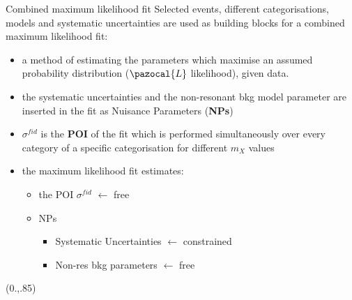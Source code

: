\documentclass[10pt,UKenglish, leqno, xcolor = dvipsnames]{beamer}
\begin{document}
	\begin{frame}{Combined maximum likelihood fit}
		\vfill
		Selected events, different categorisations, models and systematic uncertainties are used as building blocks for a combined maximum likelihood fit:
		\begin{itemize}
			\item a method of estimating the parameters which maximise an assumed probability distribution ($\pazocal{L}$ likelihood), given data.
			\item the systematic uncertainties and the non-resonant bkg model parameter are inserted in the fit as Nuisance Parameters (\textbf{NPs})
			\item $\sigma^{fid}$ is the \textbf{POI} of the fit which is performed simultaneously over every category of a specific categorisation for different $m_X$ values
			\item the maximum likelihood fit estimates:
			\begin{itemize}
				\item the POI $\sigma^{fid}$  $\leftarrow$ free
				\item NPs
				\begin{itemize}
					\item Systematic Uncertainties $\leftarrow$ constrained 
					\item Non-res bkg parameters $\leftarrow$ free
				\end{itemize}
			\end{itemize}
		\end{itemize}
		\vspace{.2cm}
		\vfill
		\begin{textblock}{1}(0.,.85)
			\begin{figure}
			\end{figure}
		\end{textblock}
	\end{frame}
	
\end{document}

